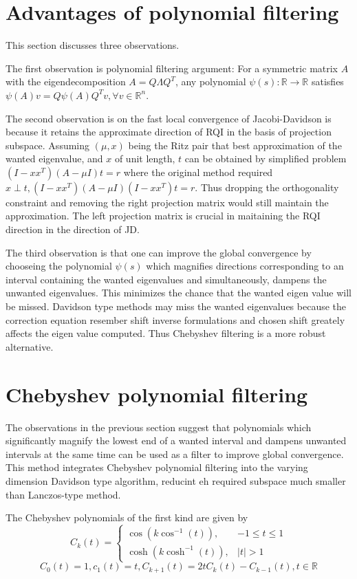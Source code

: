 \documentclass[10pt,a4paper,twoside]{report}
\theoremstyle{definition}
\newcommand{\abs}[1]{\lvert {#1} \rvert}
\begin{document}
	\section{Advantages of polynomial filtering}
	This section discusses three observations. 
	
	The first observation is polynomial filtering argument: For a symmetric matrix $A$ with the eigendecomposition $A=Q\Lambda Q^T$, any polynomial $\psi(s): \mathbb{R} \rightarrow \mathbb{R}$ satisfies $\psi(A)v = Q\psi(A)Q^Tv, \forall v \in \mathbb{R}^n$. 

	The second observation is on the fast local convergence of Jacobi-Davidson is because it retains the approximate direction of RQI in the basis of projection subspace. Assuming $(\mu, x)$ being the Ritz pair that best approximation of the wanted eigenvalue, and $x$ of unit length, $t$ can be obtained by simplified problem $(I-xx^T)(A-\mu I)t = r$ where the original method required $x \perp t,(I-xx^T)(A-\mu I)(I-xx^T)t = r$. Thus dropping the orthogonality constraint and removing the right projection matrix would still maintain the approximation. The left projection matrix is crucial in maitaining the RQI direction in the direction of JD.
	
	The third observation is that one can improve the global convergence by chooseing the polynomial $\psi(s)$ which magnifies directions corresponding to an interval containing the wanted eigenvalues and simultaneously, dampens the unwanted eigenvalues. This minimizes the chance that the wanted eigen value will be missed. Davidson type methods may miss the wanted eigenvalues because the correction equation resember shift inverse formulations and chosen shift greately affects the eigen value computed. Thus Chebyshev filtering is a more robust alternative. 

	\section{Chebyshev polynomial filtering}
	The observations in the previous section suggest that polynomials which significantly magnify the lowest end of a wanted interval and dampens unwanted intervals at the same time can be used as a filter to improve global convergence. This method integrates Chebyshev polynomial filtering into the varying dimension Davidson type algorithm, reducint eh required subspace much smaller than Lanczos-type method. 

	The Chebyshev polynomials of the first kind are given by 
	$$ C_{k}(t)= \begin{cases}
		\cos(k \cos^{-1}(t)), &-1\le t \le 1 \\
		\cosh(k \cosh^{-1}(t)), & \abs{t} > 1
	\end{cases} $$
	$$
		C_{0}(t)=1, c_{1}(t)=t, C_{k+1}(t)=2tC_{k}(t) - C_{k-1}(t), t \in \mathbb{R}
	$$
\end{document}
